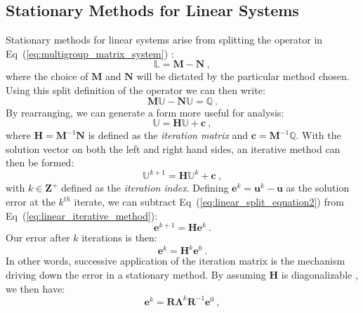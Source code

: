 \documentclass[letterpaper,12pt]{article}
\begin{document}
\subsection{Stationary Methods for Linear Systems}
\label{subsec:stationary_solvers}
Stationary methods for linear systems arise from splitting the
operator in Eq~(\ref{eq:multigroup_matrix_system})
\cite{leveque_finite_2007}:
\begin{equation}
  \mathbb{L} = \mathbf{M} - \mathbf{N}\:,
  \label{eq:split_linear_operator}
\end{equation}
where the choice of $\mathbf{M}$ and $\mathbf{N}$ will be dictated by
the particular method chosen. Using this split definition of the
operator we can then write:
\begin{equation}
  \mathbf{M}\mathbb{U} - \mathbf{N}\mathbb{U} = \mathbb{Q}\:.
  \label{eq:linear_split_equation1}
\end{equation}
By rearranging, we can generate a form more useful for analysis:
\begin{equation}
  \mathbb{U} = \mathbf{H}\mathbb{U} + \mathbf{c}\:,
  \label{eq:linear_split_equation2}
\end{equation}
where $\mathbf{H}=\mathbf{M}^{-1}\mathbf{N}$ is defined as the
\textit{iteration matrix} and
$\mathbf{c}=\mathbf{M}^{-1}\mathbb{Q}$. With the solution vector on
both the left and right hand sides, an iterative method can then be
formed:
\begin{equation}
    \mathbb{U}^{k+1} = \mathbf{H}\mathbb{U}^k + \mathbf{c}\:,
  \label{eq:linear_iterative_method}
\end{equation}
with $k \in \mathbf{Z}^+$ defined as the \textit{iteration
  index}. Defining $\mathbf{e}^k = \mathbf{u}^k - \mathbf{u}$ as the
solution error at the $k^{th}$ iterate, we can subtract
Eq~(\ref{eq:linear_split_equation2}) from
Eq~(\ref{eq:linear_iterative_method}):
\begin{equation}
  \mathbf{e}^{k+1} = \mathbf{H}\mathbf{e}^k\:.
  \label{eq:linear_iterative_error}
\end{equation}
Our error after $k$ iterations is then:
\begin{equation}
  \mathbf{e}^{k} = \mathbf{H}^k\mathbf{e}^0\:.
  \label{eq:linear_k_iter_error}
\end{equation}
In other words, successive application of the iteration matrix is the
mechanism driving down the error in a stationary method. By assuming
$\mathbf{H}$ is diagonalizable \cite{saad_iterative_2003}, we then
have:
\begin{equation}
  \mathbf{e}^{k} =
  \mathbf{R}\boldsymbol{\Lambda}^k\mathbf{R}^{-1}\mathbf{e}^0\:,
  \label{eq:linear_k_iter_error_diag}
\end{equation}
\end{document}
